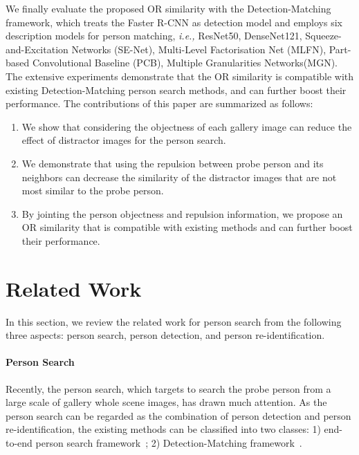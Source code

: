 \documentclass[journal]{IEEEtran}
\begin{document}
We finally evaluate the proposed OR similarity with the Detection-Matching framework, which treats the Faster R-CNN as detection model and employs six description models for person matching, \emph{i.e.,} ResNet50\cite{HeZRS15}, DenseNet121\cite{HuangLMW17}, Squeeze-and-Excitation Networks (SE-Net)\cite{HuSS18}, Multi-Level Factorisation Net (MLFN)\cite{ChangHX18}, Part-based Convolutional Baseline (PCB)\cite{SunZYTW18}, Multiple Granularities Networks(MGN)\cite{WangYCLZ18}. 
The extensive experiments demonstrate that the OR similarity is compatible with existing Detection-Matching person search methods, and can further boost their performance. 
The contributions of this paper are summarized as follows:
\begin{enumerate} 
\item We show that considering the objectness of each gallery image can reduce the effect of distractor images for the person search. 
\item We demonstrate that using the repulsion between probe person and its neighbors can decrease the similarity of the distractor images that are not most similar to the probe person.
\item By jointing the person objectness and repulsion information, we propose an OR similarity that is compatible with existing methods and can further boost their performance.
\end{enumerate}

\section{Related Work}
In this section, we review the related work for person search from the following three aspects: person search, person detection, and person re-identification.

\paragraph{Person Search}
Recently, the person search, which targets to search the probe person from a large scale of gallery whole scene images, has drawn much attention. As the person search can be regarded as the combination of person detection and person re-identification, the existing methods can be classified into two classes: 1) end-to-end person search framework~\cite{LiYC18,XiaoLWLW17,LiuFJKZQJY17,DBLP:conf/cvpr/MunjalATG19}; 2) Detection-Matching framework~\cite{LanZG18,ChenZOYT18,DBLP:conf/cvpr/YanZNZXY19}. 
\end{document}

